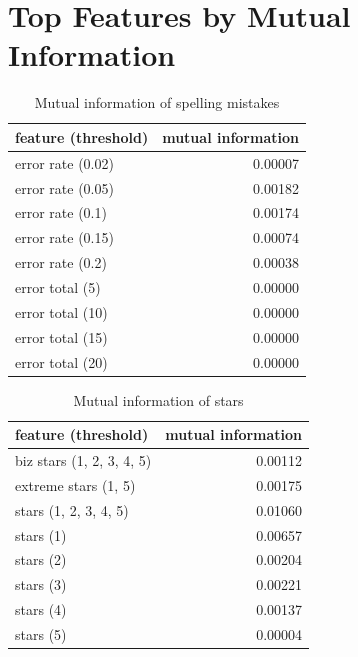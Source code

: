 \chapter{Top Features by Mutual Information}\label{app:mi}

\begin{table}[h!]

\centering
\begin{tabular}{lr}
\toprule
\textbf{feature (threshold)} & \textbf{mutual information} \\
\midrule
error rate (0.02) & 0.00007 \\
error rate (0.05) & 0.00182 \\
error rate (0.1) & 0.00174 \\
error rate (0.15) & 0.00074 \\
error rate (0.2) & 0.00038 \\
error total (5) & 0.00000 \\
error total (10) & 0.00000 \\
error total (15) & 0.00000 \\
error total (20) & 0.00000 \\
\bottomrule
\end{tabular}

\caption{Mutual information of spelling mistakes}\label{tab:mi_errors}
\end{table}

\begin{table}[h!]

\centering
\begin{tabular}{lr}
\toprule
\textbf{feature (threshold)} & \textbf{mutual information} \\
\midrule
biz stars (1, 2, 3, 4, 5) & 0.00112 \\
extreme stars (1, 5) & 0.00175 \\
stars (1, 2, 3, 4, 5)& 0.01060 \\
stars (1) & 0.00657 \\
stars (2) & 0.00204 \\
stars (3) & 0.00221 \\
stars (4) & 0.00137 \\
stars (5) & 0.00004 \\
\bottomrule
\end{tabular}

\caption{Mutual information of stars}\label{tab:mi_stars}
\end{table}


